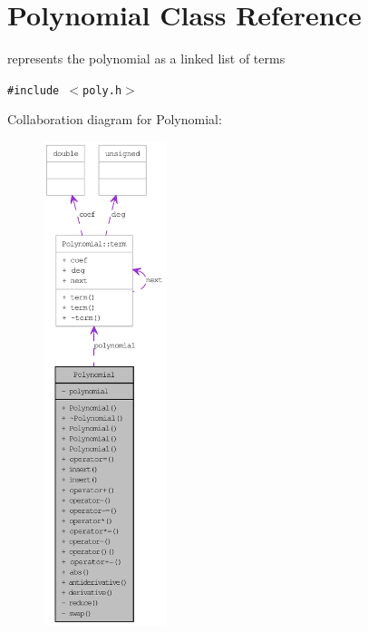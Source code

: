 \hypertarget{classPolynomial}{
\section{Polynomial Class Reference}
\label{classPolynomial}
}
represents the polynomial as a linked list of terms  


{\tt \#include $<$poly.h$>$}

Collaboration diagram for Polynomial:\nopagebreak
\begin{figure}[H]
\begin{center}
\leavevmode
\includegraphics[height=400pt]{classPolynomial__coll__graph}
\end{center}
\end{figure}
